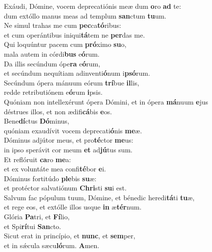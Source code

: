 \evenverse Exáudi, Dómine, vocem deprecatiónis meæ dum \textbf{o}ro \textbf{ad} te:~\*\\
\evenverse dum extóllo manus meas ad templum \textbf{san}ctum \textbf{tu}um.\\
\oddverse Ne simul trahas me cum \textbf{pec}ca\textbf{tó}ribus:~\*\\
\oddverse et cum operántibus iniqui\textbf{tá}tem ne \textbf{per}das me.\\
\evenverse Qui loquúntur pacem cum \textbf{pró}ximo \textbf{su}o,~\*\\
\evenverse mala autem in córdi\textbf{bus} e\textbf{ó}rum.\\
\oddverse Da illis secúndum ópe\textbf{ra} e\textbf{ó}rum,~\*\\
\oddverse et secúndum nequítiam adinventi\textbf{ó}num i\textbf{psó}rum.\\
\evenverse Secúndum ópera mánuum eórum \textbf{trí}bue \textbf{il}lis,~\*\\
\evenverse redde retributiónem e\textbf{ó}rum \textbf{i}psis.\\
\oddverse Quóniam non intellexérunt ópera Dómini, et in ópera \textbf{má}nuum \textbf{e}jus~\*\\
\oddverse déstrues illos, et non ædifi\textbf{cá}bis \textbf{e}os.\\
\evenverse Bene\textbf{dí}ctus \textbf{Dó}minus,~\*\\
\evenverse quóniam exaudívit vocem deprecati\textbf{ó}nis \textbf{me}æ.\\
\oddverse Dóminus adjútor meus, et pro\textbf{té}ctor \textbf{me}us:~\*\\
\oddverse in ipso sperávit cor meum \textbf{et} ad\textbf{jú}tus sum.\\
\evenverse Et reflóruit \textbf{ca}ro \textbf{me}a:~\*\\
\evenverse et ex voluntáte mea confi\textbf{té}bor \textbf{e}i.\\
\oddverse Dóminus fortitúdo \textbf{ple}bis \textbf{su}æ:~\*\\
\oddverse et protéctor salvatiónum \textbf{Chri}sti \textbf{su}i est.\\
\evenverse Salvum fac pópulum tuum, Dómine, et bénedic heredi\textbf{tá}ti \textbf{tu}æ,~\*\\
\evenverse et rege eos, et extólle illos usque \textbf{in} æ\textbf{tér}num.\\
\oddverse Glória \textbf{Pa}tri, et \textbf{Fí}lio,~\*\\
\oddverse et Spi\textbf{rí}tui \textbf{San}cto.\\
\evenverse Sicut erat in princípio, et \textbf{nunc}, et \textbf{sem}per,~\*\\
\evenverse et in sǽcula sæcu\textbf{ló}rum. \textbf{A}men.\\
